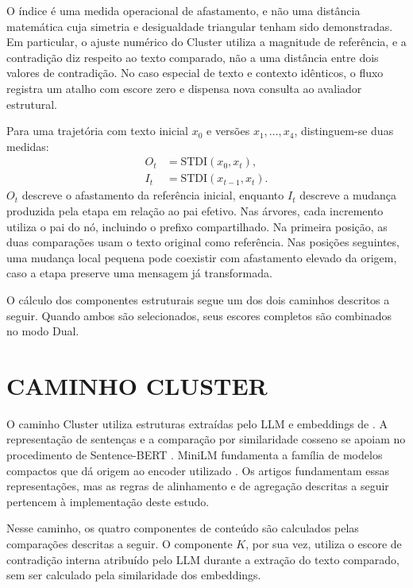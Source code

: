 O índice é uma medida operacional de afastamento, e não uma distância matemática cuja simetria e desigualdade triangular tenham sido demonstradas. Em particular, o ajuste numérico do Cluster utiliza a magnitude de referência, e a contradição diz respeito ao texto comparado, não a uma distância entre dois valores de contradição. No caso especial de texto e contexto idênticos, o fluxo registra um atalho com escore zero e dispensa nova consulta ao avaliador estrutural.

Para uma trajetória com texto inicial $x_0$ e versões $x_1,\ldots,x_4$, distinguem-se duas medidas:
\begin{align}
 O_t &= \mathrm{STDI}(x_0,x_t), \label{eq:stdi-original}\\
 I_t &= \mathrm{STDI}(x_{t-1},x_t). \label{eq:stdi-incremental}
\end{align}
$O_t$ descreve o afastamento da referência inicial, enquanto $I_t$ descreve a mudança produzida pela etapa em relação ao pai efetivo. Nas árvores, cada incremento utiliza o pai do nó, incluindo o prefixo compartilhado. Na primeira posição, as duas comparações usam o texto original como referência. Nas posições seguintes, uma mudança local pequena pode coexistir com afastamento elevado da origem, caso a etapa preserve uma mensagem já transformada.

O cálculo dos componentes estruturais segue um dos dois caminhos descritos a seguir. Quando ambos são selecionados, seus escores completos são combinados no modo Dual.

\section{CAMINHO CLUSTER}

O caminho Cluster utiliza estruturas extraídas pelo LLM e embeddings de . A representação de sentenças e a comparação por similaridade cosseno se apoiam no procedimento de Sentence-BERT \cite{reimers2019sbert}. MiniLM fundamenta a família de modelos compactos que dá origem ao encoder utilizado \cite{wang2020minilm}. Os artigos fundamentam essas representações, mas as regras de alinhamento e de agregação descritas a seguir pertencem à implementação deste estudo.

Nesse caminho, os quatro componentes de conteúdo são calculados pelas comparações descritas a seguir. O componente $K$, por sua vez, utiliza o escore de contradição interna atribuído pelo LLM durante a extração do texto comparado, sem ser calculado pela similaridade dos embeddings.

